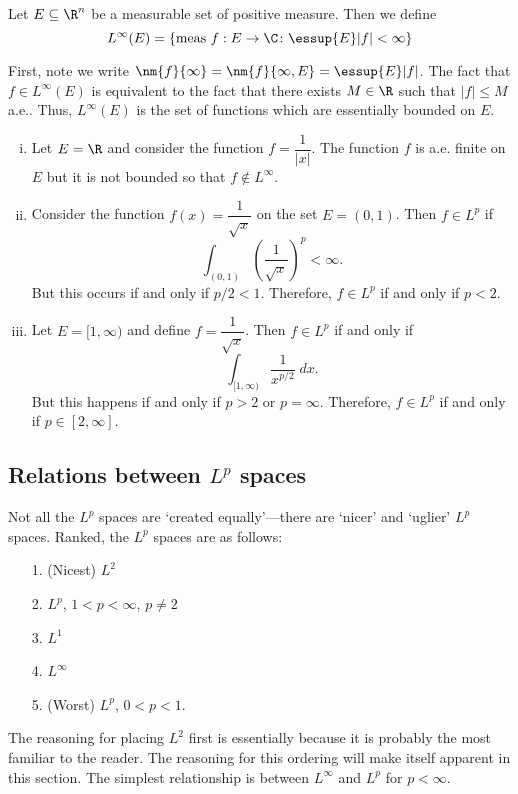 \begin{dfn}[$L^\infty(E)$]
Let $E \subseteq \R^n$ be a measurable set of positive measure. Then we define
	\[
	L^\infty(E)= \{ \text{meas } f: E \to \C \colon \essup{E} |f| < \infty \}
	\]
\end{dfn}

First, note we write $\nm{f}{\infty}= \nm{f}{\infty,E}= \essup{E} |f|$. The fact that $f \in L^\infty(E)$ is equivalent to the fact that there exists $M \in \R$ such that $|f| \leq M$ a.e.. Thus, $L^\infty(E)$ is the set of functions which are essentially bounded on $E$. 


\begin{ex} \hfill
\begin{enumerate}[(i)]
\item Let $E=\R$ and consider the function $f= \dfrac{1}{|x|}$. The function $f$ is a.e. finite on $E$ but it is not bounded so that $f \notin L^\infty$. 

\item Consider the function $f(x)= \dfrac{1}{\sqrt{x}}$ on the set $E=(0,1)$. Then $f \in L^p$ if
	\[
	\int_{(0,1)} \left( \dfrac{1}{\sqrt{x}} \right)^p < \infty.
	\]
But this occurs if and only if $p/2<1$. Therefore, $f \in L^p$ if and only if $p<2$. 

\item Let $E= [1,\infty)$ and define $f= \dfrac{1}{\sqrt{x}}$. Then $f \in L^p$ if and only if
	\[
	\int_{[1,\infty)} \dfrac{1}{x^{p/2}} \; dx.
	\]
But this happens if and only if $p>2$ or $p= \infty$. Therefore, $f \in L^p$ if and only if $p \in [2,\infty]$. 
\end{enumerate}
\end{ex} \xqed



\subsection{Relations between $L^p$ spaces}

Not all the $L^p$ spaces are `created equally'---there are `nicer' and `uglier' $L^p$ spaces. Ranked, the $L^p$ spaces are as follows:
	\begin{enumerate}
	\item[1.] (Nicest) $L^2$
	\item[2.] $L^p$, $1<p<\infty$, $p \neq 2$
	\item[3.] $L^1$
	\item[4.] $L^\infty$
	\item[5.] (Worst) $L^p$, $0<p<1$. 
	\end{enumerate}
The reasoning for placing $L^2$ first is essentially because it is probably the most familiar to the  reader. The reasoning for this ordering will make itself apparent in this section. The simplest relationship is between $L^\infty$ and $L^p$ for $p<\infty$.


